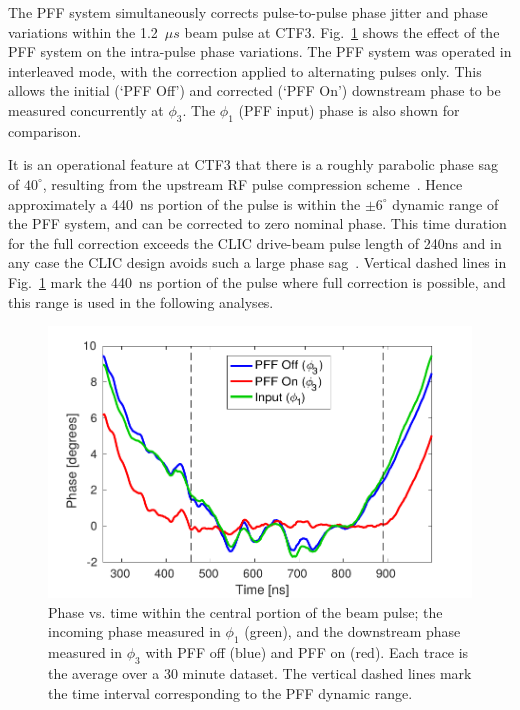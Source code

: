 \documentclass[%
 reprint,
 superscriptaddress,
 amsmath,
 amssymb,
 prl,
]{revtex4-1}
\begin{document}
The PFF system simultaneously corrects pulse-to-pulse phase jitter and phase 
variations within the 1.2~\(\mu s\) beam pulse at CTF3. 
Fig.~\ref{fig:shape} shows the effect of the PFF system on the intra-pulse 
phase variations. The PFF system was operated in interleaved mode, with 
the correction applied to alternating pulses only. This allows 
the initial (`PFF Off') and corrected (`PFF On') downstream phase 
to be measured concurrently at \(\phi_3\). The \(\phi_1\) (PFF input) phase 
is also shown for comparison. 

It is an operational feature at CTF3 that there is a roughly parabolic phase 
sag of \(40^\circ\), resulting from the upstream RF pulse compression 
scheme~\cite{CLICCDR}. Hence approximately a 440~ns portion of the pulse is 
within the \(\pm 6^\circ\) dynamic range of the PFF system, and can be 
corrected to zero nominal phase. 
This time duration for the full correction exceeds the CLIC drive-beam pulse 
length of 240ns and in any case the CLIC design avoids such 
a large phase sag~\cite{CLICCDR}. 
Vertical dashed lines in Fig.~\ref{fig:shape} mark the 440~ns portion of 
the pulse where full correction is possible, and this range is used in the 
following analyses. 

\begin{figure}
	\includegraphics[width=\columnwidth]{figs/shape}
	\caption{\label{fig:shape}Phase vs. time within the central portion of the  
	beam pulse; the incoming phase measured in \(\phi_1\) 
	(green), and the downstream phase measured in \(\phi_3\) with PFF off 
	(blue) and PFF on (red). Each trace is the average over a 30 minute dataset.
	The vertical dashed lines mark the time interval corresponding to the PFF 
	dynamic range. }
\end{figure}
\end{document}
